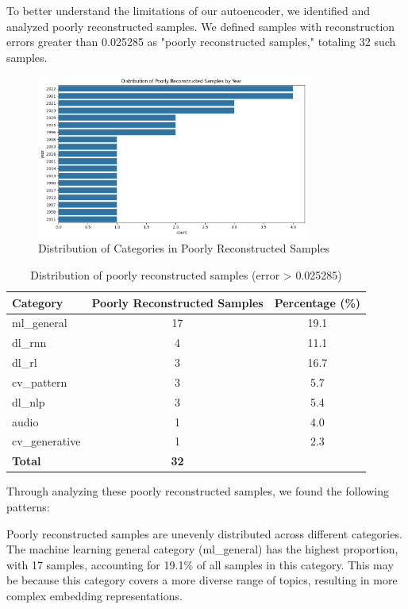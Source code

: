 \documentclass{article}
\begin{document}
To better understand the limitations of our autoencoder, we identified and analyzed poorly reconstructed samples. We defined samples with reconstruction errors greater than 0.025285 as "poorly reconstructed samples," totaling 32 such samples.

\begin{figure}[h!]
\centering
\includegraphics[width=0.8\textwidth]{figs/reconstruction2.png}
\caption{Distribution of Categories in Poorly Reconstructed Samples}
\end{figure}

\begin{table}[htbp]
    \centering
    \caption{Distribution of poorly reconstructed samples (error > 0.025285)}
    \begin{tabular}{lcc}
        \toprule
        \textbf{Category} & \textbf{Poorly Reconstructed Samples} & \textbf{Percentage (\%)} \\
        \midrule
        ml\_general & 17 & 19.1 \\
        dl\_rnn & 4 & 11.1 \\
        dl\_rl & 3 & 16.7 \\
        cv\_pattern & 3 & 5.7 \\
        dl\_nlp & 3 & 5.4 \\
        audio & 1 & 4.0 \\
        cv\_generative & 1 & 2.3 \\
        \midrule
        \textbf{Total} & \textbf{32} & \\
        \bottomrule
    \end{tabular}
    \label{tab:poorly_reconstructed}
\end{table}

Through analyzing these poorly reconstructed samples, we found the following patterns:

Poorly reconstructed samples are unevenly distributed across different categories. The machine learning general category (ml\_general) has the highest proportion, with 17 samples, accounting for 19.1\% of all samples in this category. This may be because this category covers a more diverse range of topics, resulting in more complex embedding representations.
    
\end{document}
